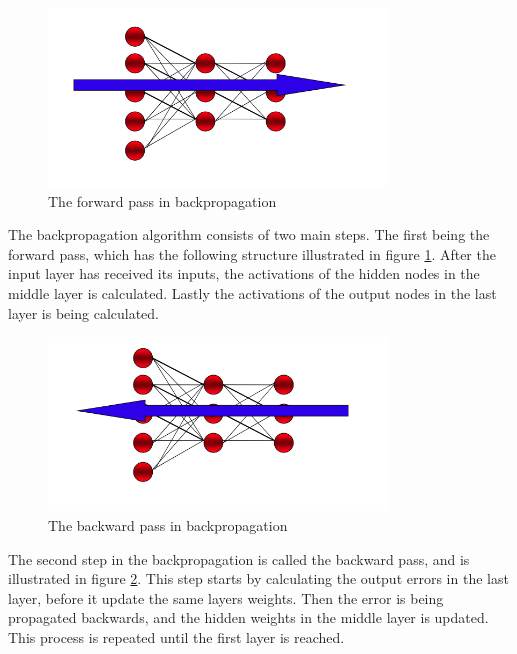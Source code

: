 \documentclass[USenglish]{ifimaster}  %
\begin{document}
\begin{figure}[ht]
    \centering
    \includegraphics[width=0.8\textwidth]{bilder/forward_prop.png}
    \caption{The forward pass in backpropagation \cite{website:inf_4490_mlp}}
    \label{fig:forward_step}
\end{figure}

The backpropagation algorithm consists of two main steps. The first being the forward pass, which has the following structure illustrated in figure \ref{fig:forward_step}. After the input layer has received its inputs, the activations of the hidden nodes in the middle layer is calculated. Lastly the activations of the output nodes in the last layer is being calculated. 

\begin{figure}[ht]
    \centering
    \includegraphics[width=0.8\textwidth]{bilder/backward_prop.png}
    \caption{The backward pass in backpropagation \cite{website:inf_4490_mlp}}
    \label{fig:backward_step}
\end{figure}

The second step in the backpropagation is called the backward pass, and is illustrated in figure \ref{fig:backward_step}. This step starts by calculating the output errors in the last layer, before it update the same layers weights. Then the error is being propagated backwards, and the hidden weights in the middle layer is updated. This process is repeated until the first layer is reached.
\end{document}

